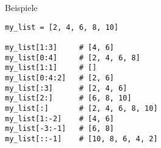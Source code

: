 \begin{fragile}
\begin{exampleblock}{Beispiele}
\begin{overprint}
\begin{verbatim}
my_list = [2, 4, 6, 8, 10]

my_list[1:3]     # [4, 6]
my_list[0:4]     # [2, 4, 6, 8]
my_list[1:1]     # []
my_list[0:4:2]   # [2, 6]
my_list[:3]      # [2, 4, 6]
my_list[2:]      # [6, 8, 10]
my_list[:]       # [2, 4, 6, 8, 10]
my_list[1:-2]    # [4, 6]
my_list[-3:-1]   # [6, 8] 
my_list[::-1]    # [10, 8, 6, 4, 2]  
\end{verbatim}

\end{overprint}
\end{exampleblock}
\end{fragile}

